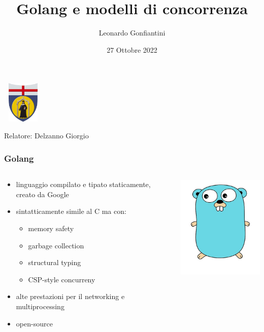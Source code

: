 \documentclass{beamer}
\begin{document}
\title[Golang e modelli di concorrenza]{Golang e modelli di concorrenza}
\author{Leonardo Gonfiantini}
\date{27 Ottobre 2022}
\begin{frame}
\centerline{\includegraphics[width=2cm,height=2cm,keepaspectratio]{logo-unige-pulito.png}}
  \titlepage
  \centerline{Relatore: Delzanno Giorgio}
\end{frame}

\begin{frame}
  \frametitle{Golang}
  \begin{columns}
    \begin{column}{0.6\textwidth}
      \begin{itemize}
        \item linguaggio compilato e tipato staticamente, creato da Google
        \item sintatticamente simile al C ma con: \begin{itemize}
            \item memory safety
            \item garbage collection
            \item structural typing
            \item CSP-style concurreny
        \end{itemize}
        \pause
        \item alte prestazioni per il networking e multiprocessing
        \item open-source
      \end{itemize}
    \end{column}
    \begin{column}{0.4\textwidth}
      \centerline{\includegraphics[width=5cm,height=5cm,keepaspectratio]{go-mascotte.jpg}}
    \end{column}
  \end{columns}
\end{frame}
\end{document}
